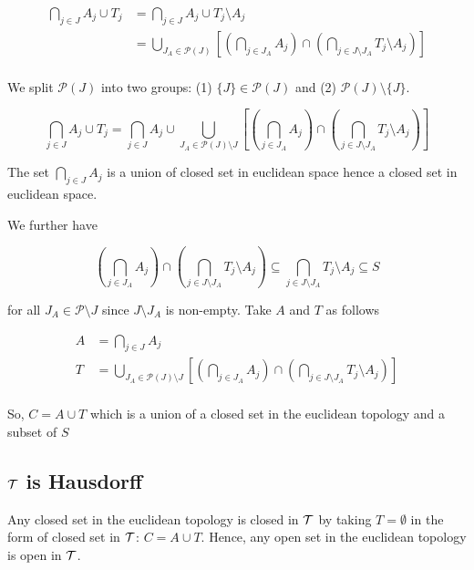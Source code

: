 \documentclass{article}
\begin{document}
\begin{align*}
    \bigcap_{j \in J} A_j \cup T_j
        &= \bigcap_{j \in J} A_j \cup T_j \setminus A_j \\
        &= \bigcup_{J_A \in \mathcal{P}(J)} \left[ \left( \bigcap_{j \in J_A} A_j \right) \cap \left( \bigcap_{j \in J \setminus J_A} T_j \setminus A_j \right) \right] \\
\end{align*}

We split $\mathcal{P}(J)$ into two groups: (1) $\{ J \} \in \mathcal{P}(J)$ and (2) $\mathcal{P}(J) \setminus \{ J \}$.

$$
    \bigcap_{j \in J} A_j \cup T_j
        = \bigcap_{j \in J} A_j \cup \bigcup_{J_A \in \mathcal{P}(J) \setminus J} \left[ \left( \bigcap_{j \in J_A} A_j \right) \cap \left( \bigcap_{j \in J \setminus J_A} T_j \setminus A_j \right) \right]
$$

The set $\bigcap_{j \in J} A_j$ is a union of closed set in euclidean space hence a closed set in euclidean space.

We further have 

$$
    \left( \bigcap_{j \in J_A} A_j \right) \cap \left( \bigcap_{j \in J \setminus J_A} T_j \setminus A_j \right)
        \subseteq \bigcap_{j \in J \setminus J_A} T_j \setminus A_j
        \subseteq S
$$

for all $J_A \in \mathcal{P} \setminus J$ since $J \setminus J_A$ is non-empty. Take $A$ and $T$ as follows

\begin{align*}
    A   &= \bigcap_{j \in J} A_j \\
    T   &= \bigcup_{J_A \in \mathcal{P}(J) \setminus J} \left[ \left( \bigcap_{j \in J_A} A_j \right) \cap \left( \bigcap_{j \in J \setminus J_A} T_j \setminus A_j \right) \right] \\
\end{align*}

So, $C = A \cup T$ which is a union of a closed set in the euclidean topology and a subset of $S$

\subsection*{$\mathcal{T}$ is Hausdorff}

Any closed set in the euclidean topology is closed in $\mathcal{T}$ by taking $T = \emptyset$ in the form of closed set in $\mathcal{T}$: $C = A \cup T$. Hence, any open set in the euclidean topology is open in $\mathcal{T}$.
\end{document}
